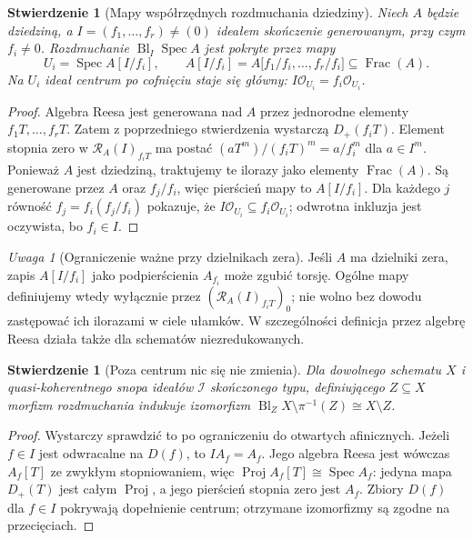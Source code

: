 \documentclass[11pt,a4paper,openany]{report}
\numberwithin{equation}{section}
\theoremstyle{plain}
\newtheorem{stwierdzenie}[twierdzenie]{Stwierdzenie}
\theoremstyle{definition}
\theoremstyle{remark}
\newtheorem{uwaga}[twierdzenie]{Uwaga}
\newcommand{\Spec}{\operatorname{Spec}}
\newcommand{\Frac}{\operatorname{Frac}}
\begin{document}
\begin{stwierdzenie}[Mapy współrzędnych rozdmuchania dziedziny]
\label{st:ga5-blowup-charts}
Niech $A$ będzie dziedziną, a
$I=(f_1,\ldots,f_r)\ne(0)$ ideałem skończenie generowanym,
przy czym $f_i\ne0$. Rozdmuchanie $\operatorname{Bl}_I\Spec A$
jest pokryte przez mapy
\[
 U_i=\Spec A[I/f_i],\qquad
 A[I/f_i]=A\bigl[f_1/f_i,\ldots,f_r/f_i\bigr]\subseteq\Frac(A).
\]
Na $U_i$ ideał centrum po cofnięciu staje się główny:
$I\mathcal O_{U_i}=f_i\mathcal O_{U_i}$.
\end{stwierdzenie}
\begin{proof}
Algebra Reesa jest generowana nad $A$ przez jednorodne
elementy $f_1T,\ldots,f_rT$. Zatem z poprzedniego
stwierdzenia wystarczą $D_+(f_iT)$. Element stopnia
zero w $\mathcal R_A(I)_{f_iT}$ ma postać
$(aT^m)/(f_iT)^m=a/f_i^m$ dla $a\in I^m$.
Ponieważ $A$ jest dziedziną, traktujemy te ilorazy
jako elementy $\Frac(A)$. Są generowane przez $A$
oraz $f_j/f_i$, więc pierścień mapy to $A[I/f_i]$.
Dla każdego $j$ równość $f_j=f_i(f_j/f_i)$ pokazuje,
że $I\mathcal O_{U_i}\subseteq f_i\mathcal O_{U_i}$;
odwrotna inkluzja jest oczywista, bo $f_i\in I$.
\end{proof}

\begin{uwaga}[Ograniczenie ważne przy dzielnikach zera]
Jeśli $A$ ma dzielniki zera, zapis $A[I/f_i]$ jako
podpierścienia $A_{f_i}$ może zgubić torsję. Ogólne
mapy definiujemy wtedy wyłącznie przez
$(\mathcal R_A(I)_{f_iT})_0$; nie wolno bez dowodu
zastępować ich ilorazami w ciele ułamków.
W szczególności definicja przez algebrę Reesa działa
także dla schematów niezredukowanych.
\end{uwaga}

\begin{stwierdzenie}[Poza centrum nic się nie zmienia]
\label{st:ga5-off-centre}
Dla dowolnego schematu $X$ i quasi-koherentnego snopa
ideałów $\mathcal I$ skończonego typu, definiującego $Z\subseteq X$
morfizm rozdmuchania indukuje izomorfizm
$\operatorname{Bl}_Z X\setminus\pi^{-1}(Z)\cong X\setminus Z$.
\end{stwierdzenie}
\begin{proof}
Wystarczy sprawdzić to po ograniczeniu do otwartych
afinicznych. Jeżeli $f\in I$ jest odwracalne na $D(f)$,
to $I A_f=A_f$. Jego algebra Reesa jest wówczas
$A_f[T]$ ze zwykłym stopniowaniem, więc
$\operatorname{Proj}A_f[T]\cong\Spec A_f$: jedyna mapa
$D_+(T)$ jest całym $\operatorname{Proj}$, a jego
pierścień stopnia zero jest $A_f$. Zbiory $D(f)$
dla $f\in I$ pokrywają dopełnienie centrum; otrzymane
izomorfizmy są zgodne na przecięciach.
\end{proof}
\end{document}

